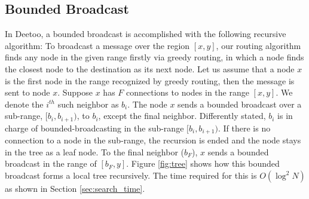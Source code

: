 \documentclass[conference]{IEEEtran}
\begin{document}
\subsection{Bounded Broadcast}
\label{sec:broadcast}

In Deetoo, a bounded broadcast is accomplished with the following 
recursive algorithm:  
To broadcast a message over the region $[x, y]$, 
our routing algorithm finds any node in the given range firstly via greedy routing,
in which a node finds the closest node to the destination as its next node.
Let us assume that a node $x$ is the first node in the range recognized by greedy routing, 
then the message is sent to node $x$. 
Suppose $x$ has $F$ connections to nodes in the range $[x, y]$. 
We denote the $i^{th}$ such neighbor as $b_i$.
The node $x$ sends a bounded broadcast over a sub-range, 
$[b_i, b_{i+1})$, to $b_i$, except the final neighbor. 
Differently stated, $b_i$ is in charge of bounded-broadcasting 
in the sub-range $[b_i, b_{i+1})$. If there is no connection to a node in the sub-range, 
the recursion is ended and the node stays in the tree as a leaf node.
To the final
neighbor ($b_F$), $x$ sends a bounded broadcast in the range of $[b_F, y]$.
Figure \ref{fig:tree} shows how this bounded broadcast forms a local 
tree recursively. The time required for this is $O(\log^2 N)$ as 
shown in Section \ref{sec:search_time}.
\end{document}
